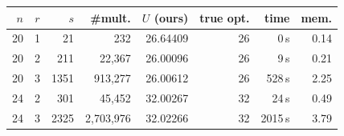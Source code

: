 \begin{tabular}{r c r r r r r r}\toprule
$n$ & $r$ & $s$ & \#mult. & $U$ (ours) & true opt. & time & mem. \\\midrule
20 & 1 & 21 & 232 & 26.64409 & 26 & 0\,s & 0.14 \\
20 & 2 & 211 & 22{,}367 & 26.00096 & 26 & 9\,s & 0.21 \\
20 & 3 & 1351 & 913{,}277 & 26.00612 & 26 & 528\,s & 2.25 \\
24 & 2 & 301 & 45{,}452 & 32.00267 & 32 & 24\,s & 0.49 \\
24 & 3 & 2325 & 2{,}703{,}976 & 32.02266 & 32 & 2015\,s & 3.79 \\
\bottomrule\end{tabular}
